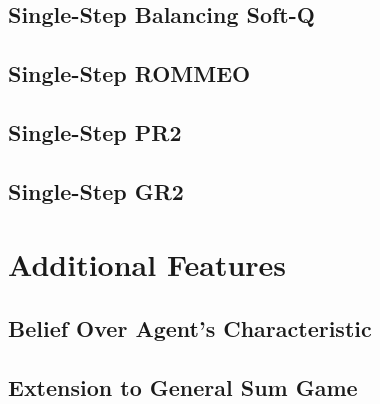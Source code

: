\subsection{Single-Step Balancing Soft-Q \cite{grau2018balancing}}
\subsection{Single-Step ROMMEO \cite{tian2019regularized}}
\subsection{Single-Step PR2 \cite{wen2019probabilistic}}
\subsection{Single-Step GR2 \cite{wen2019multi}}

\section{Additional Features}
\subsection{Belief Over Agent's Characteristic}
\subsection{Extension to General Sum Game}


